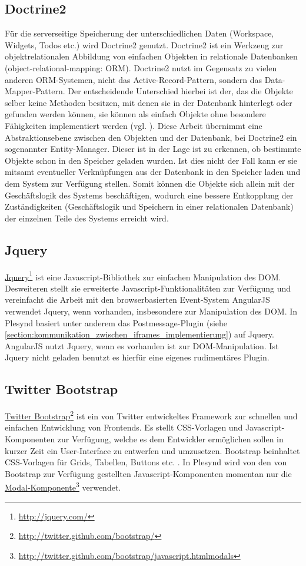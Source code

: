\subsection{Doctrine2}\label{section:doctrine2}
Für die serverseitige Speicherung der unterschiedlichen Daten (Workspace, Widgets, Todos etc.) wird Doctrine2 genutzt. Doctrine2 ist ein Werkzeug zur objektrelationalen Abbildung von einfachen Objekten in relationale Datenbanken (object-relational-mapping: ORM). Doctrine2 nutzt im Gegensatz zu vielen anderen ORM-Systemen, nicht das Active-Record-Pattern, sondern das Data-Mapper-Pattern. Der entscheidende Unterschied hierbei ist der, das die Objekte selber keine Methoden besitzen, mit denen sie in der Datenbank hinterlegt oder gefunden werden können, sie können als einfach Objekte ohne besondere Fähigkeiten implementiert werden (vgl. \cite{Fowler2002}). Diese Arbeit übernimmt eine Abstraktionsebene zwischen den Objekten und der Datenbank, bei Doctrine2 ein sogenannter Entity-Manager. Dieser ist in der Lage ist zu erkennen, ob bestimmte Objekte schon in den Speicher geladen wurden. Ist dies nicht der Fall kann er sie mitsamt eventueller Verknüpfungen aus der Datenbank in den Speicher laden und dem System zur Verfügung stellen. Somit können die Objekte sich allein mit der Geschäftslogik des Systems beschäftigen, wodurch eine bessere Entkopplung der Zuständigkeiten (Geschäftslogik und Speichern in einer relationalen Datenbank) der einzelnen Teile des Systems erreicht wird.

\subsection{Jquery}
\href{http://jquery.com/}{Jquery}\footnote{\url{http://jquery.com/}} ist eine Javascript-Bibliothek zur einfachen Manipulation des DOM. Desweiteren stellt sie erweiterte Javascript-Funktionalitäten zur Verfügung und vereinfacht die Arbeit mit den browserbasierten Event-System AngularJS verwendet Jquery, wenn vorhanden, insbesondere zur Manipulation des DOM. In Plesynd basiert unter anderem das Postmessage-Plugin (siehe \ref{section:kommunikation_zwischen_iframes_implementierung}) auf Jquery. AngularJS nutzt Jquery, wenn es vorhanden ist zur DOM-Manipulation. Ist Jquery nicht geladen benutzt es hierfür eine eigenes rudimentäres Plugin.

\subsection{Twitter Bootstrap}
\href{http://twitter.github.com/bootstrap/}{Twitter Bootstrap}\footnote{\url{http://twitter.github.com/bootstrap/}} ist ein von Twitter entwickeltes Framework zur schnellen und einfachen Entwicklung von Frontends. Es stellt CSS-Vorlagen und Javascript-Komponenten zur Verfügung, welche es dem Entwickler ermöglichen sollen in kurzer Zeit ein User-Interface zu entwerfen und umzusetzen. Bootstrap beinhaltet CSS-Vorlagen für Grids, Tabellen, Buttons etc. . In Plesynd wird von den von Bootstrap zur Verfügung gestellten Javascript-Komponenten momentan nur die \href{http://twitter.github.com/bootstrap/javascript.htmlmodals}{Modal-Komponente}\footnote{\url{http://twitter.github.com/bootstrap/javascript.htmlmodals}} verwendet. 

